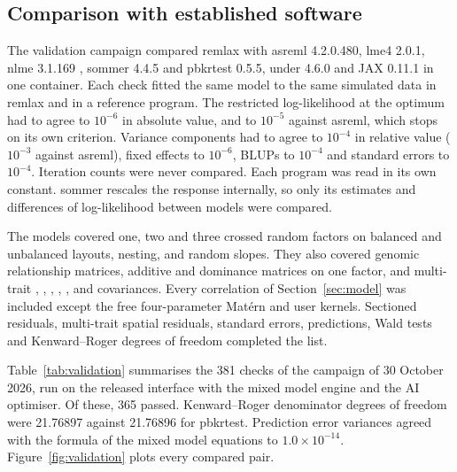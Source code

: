 \documentclass[article,nojss]{jss}
\renewcommand{\pkg}[1]{#1}
\begin{document}
\subsection{Comparison with established software}

The validation campaign compared \pkg{remlax} with \pkg{asreml} 4.2.0.480,
\pkg{lme4} 2.0.1, \pkg{nlme} 3.1.169 \citep{pinheiro2000}, \pkg{sommer}
4.4.5 and \pkg{pbkrtest} 0.5.5, under  4.6.0 and \pkg{JAX} 0.11.1
in one container. Each check fitted the same model to the same simulated data
in \pkg{remlax} and in a reference program. The restricted log-likelihood at
the optimum had to agree to $10^{-6}$ in absolute value, and to $10^{-5}$
against \pkg{asreml}, which stops on its own criterion. Variance components
had to agree to $10^{-4}$ in relative value ($10^{-3}$ against \pkg{asreml}),
fixed effects to $10^{-6}$, BLUPs to $10^{-4}$ and standard errors to
$10^{-4}$. Iteration counts were never compared. Each program was read in its
own constant. \pkg{sommer} rescales the response internally, so only its
estimates and differences of log-likelihood between models were compared.

The models covered one, two and three crossed random factors on balanced and
unbalanced layouts, nesting, and random slopes. They also covered genomic
relationship matrices, additive and dominance matrices on one factor, and
multi-trait , , , , ,
 and  covariances. Every correlation of
Section~\ref{sec:model} was included except the free four-parameter
Mat\'ern and user kernels. Sectioned residuals, multi-trait spatial residuals,
 standard errors, predictions, Wald tests and Kenward--Roger
degrees of freedom completed the list.

Table~\ref{tab:validation} summarises the 381 checks of the campaign of 30
October 2026, run on the released interface with the mixed model engine and
the AI optimiser. Of these, 365 passed. Kenward--Roger
denominator degrees of freedom were 21.76897 against 21.76896 for
\pkg{pbkrtest}. Prediction error variances agreed with the formula of the
mixed model equations to $1.0 \times 10^{-14}$. Figure~\ref{fig:validation}
plots every compared pair.
\end{document}
